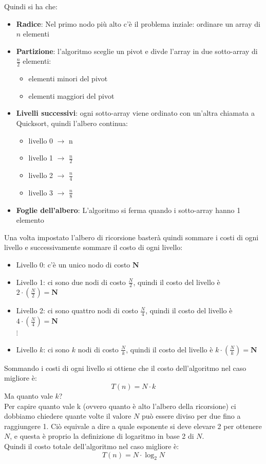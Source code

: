 \noindent Quindi si ha che:
\begin{itemize}
    \item \textbf{Radice}: Nel primo nodo più alto c'è il problema inziale: ordinare un array di $n$ elementi
    \item \textbf{Partizione}: l'algoritmo sceglie un pivot e divde l'array in due sotto-array di $ \displaystyle \frac{n}{2}$ elementi:
    \begin{itemize}
        \item elementi minori del pivot
        \item elementi maggiori del pivot
    \end{itemize}
    \item \textbf{Livelli successivi}: ogni sotto-array viene ordinato con un'altra chiamata a Quicksort, quindi l'albero continua:
    \begin{itemize}
        \item livello 0 $\rightarrow$ n
        \item livello 1 $\rightarrow$ $\frac{n}{2}$
        \item livello 2 $\rightarrow$ $\frac{n}{4}$
        \item livello 3 $\rightarrow$ $\frac{n}{8}$
    \end{itemize}
    \item  \textbf{Foglie dell'albero}: L'algoritmo si ferma quando i sotto-array hanno 1 elemento
\end{itemize}
Una volta impostato l'albero di ricorsione basterà quindi sommare i costi di ogni livello e successivamente sommare il costo di ogni livello:
\begin{itemize}[label=$\to$]
    \item Livello 0: c'è un unico nodo di costo $\bm{N}$
    \item Livello 1: ci sono due nodi di costo $\displaystyle  \frac{N}{2}$, quindi il costo del livello è $\displaystyle 2\cdot \left(\frac{N}{2} \right) = \bm{N}$
    \item Livello 2: ci sono quattro nodi di costo $\displaystyle  \frac{N}{4}$, quindi il costo del livello è $\displaystyle 4\cdot \left(\frac{N}{4} \right) = \bm{N}$\\
     $\vdots$
     \item Livello $k$:  ci sono $k$ nodi di costo $\displaystyle  \frac{N}{k}$, quindi il costo del livello è $\displaystyle k\cdot \left(\frac{N}{k} \right) = \bm{N}$
\end{itemize}
Sommando i costi di ogni livello si ottiene che il costo dell'algoritmo nel caso migliore è:
$$T(n) = N \cdot k$$
Ma quanto vale $k$?\\
Per capire quanto vale k (ovvero quanto è alto l'albero della ricorsione) ci dobbiamo chiedere quante volte il valore $N$ può essere diviso per due fino a raggiungere 1. Ciò equivale a dire a quale esponente si deve elevare 2 per ottenere $N$, e questa è proprio la definizione di logaritmo in base 2 di $N$.\\
Quindi il costo totale dell'algoritmo nel caso migliore è:
$$\boxed{T(n) = N\cdot \log_{2}N}$$

